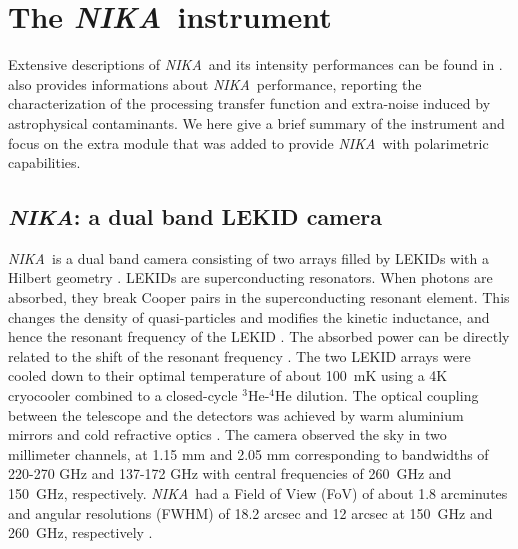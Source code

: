 \documentclass[twocolumn, traditabstract]{aa}
\newcommand{\nika}{{\it NIKA}}
\begin{document}
\section{The \nika\ instrument}
\label{nika instrument}
Extensive descriptions of \nika\ and its intensity performances can be found
in \cite{adam2014,catalano2014, monfardini2010, monfardini2011, Calvo2013}.
\cite{adam2015,adam2016} also provides informations about \nika\ performance, reporting the characterization of the processing transfer function and extra-noise induced by astrophysical contaminants. 
We here give a brief summary of the instrument and focus on the extra module that was added to
provide \nika\ with polarimetric capabilities.
\subsection{\nika: a dual band LEKID camera}
 \nika\ is a dual band camera consisting of two arrays filled by LEKIDs with a Hilbert geometry
 \citep{roesch}. LEKIDs are superconducting resonators. When photons are
 absorbed, they break Cooper pairs in the superconducting resonant element. This
 changes the density of quasi-particles and modifies the kinetic inductance, and
 hence the resonant frequency of the LEKID \citep{Doyle2008}. The absorbed power
 can be directly related to the shift of the resonant frequency
 \citep{Calvo2013}. The two LEKID arrays were cooled down to their optimal
 temperature of about 100~mK using a 4K cryocooler combined to a closed-cycle
 $^3$He-$^4$He dilution. The optical coupling between the telescope and the
 detectors was achieved by warm aluminium mirrors and cold refractive optics
 \citep{catalano2014}. The camera observed the sky in two millimeter channels,
 at 1.15 mm and 2.05 mm corresponding to bandwidths of 220-270 GHz and 137-172 GHz
 with central frequencies of 260~GHz and 150~GHz, respectively. \nika\ had a
 Field of View (FoV) of about 1.8 arcminutes and angular resolutions (FWHM) of
 18.2 arcsec and 12 arcsec at 150~GHz and 260~GHz, respectively
 \citep{catalano2014, adam2014}.
\end{document}
